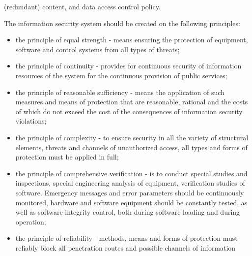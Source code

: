 \documentclass{article}
\begin{document}
\begin{multicols}{2}
(redundant) content, and data access control policy.
\par The information security system should be created on
the following principles:
\begin{itemize}
    \item the principle of equal strength - means ensuring
the protection of equipment, software and control
systems from all types of threats;
    \item the principle of continuity - provides for continuous
security of information resources of the system for
the continuous provision of public services;
    \item the principle of reasonable sufficiency - means the
application of such measures and means of protection
that are reasonable, rational and the costs of which
do not exceed the cost of the consequences of
information security violations;
    \item the principle of complexity - to ensure security in
all the variety of structural elements, threats and
channels of unauthorized access, all types and forms
of protection must be applied in full;
    \item the principle of comprehensive verification - is to
conduct special studies and inspections, special engineering analysis of equipment, verification studies of
software. Emergency messages and error parameters
should be continuously monitored, hardware and
software equipment should be constantly tested,
as well as software integrity control, both during
software loading and during operation;
    \item the principle of reliability - methods, means and
forms of protection must reliably block all penetration routes and possible channels of information
\end{itemize}


\end{multicols}
\end{document}
